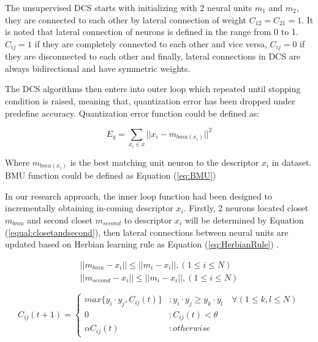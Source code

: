 The unsupervised DCS starts with initializing with 2 neural units $m_1$ and $m_2$, they are connected to each other by lateral connection of weight $C_{12} = C_{21} = 1$. It is noted that lateral connection of neurons is defined in the range from 0 to 1. $C_{ij} = 1$ if they are completely connected to each other and vice versa, $C_{ij} = 0$ if they are disconnected to each other and finally, lateral connections in DCS are always bidirectional and have symmetric weights.

The DCS algorithms then enters into outer loop which repeated until stopping condition is raised, meaning that, quantization error has been dropped under predefine accuracy. Quantization error function could be defined as:

\begin{equation}
	\label{eq:Quantizationerror}
	E_q = \sum_{x_i \in x}||x_i - m_{bmu(x_i)} ||^2
\end{equation}  

Where $m_{bmu(x_i)}$ is the best matching unit neuron to the descriptor $x_i$ in dataset. BMU function could be defined as Equation (\ref{eq:BMU})
 
In our research approach, the inner loop function had been designed to incrementally obtaining in-coming descriptor $x_i$. Firstly, 2 neurons located closet $m_{bmu}$ and second closet $m_{second}$ to descriptor $x_i$ will be determined by Equation (\ref{equal:closetandsecond}), then lateral connections between neural units are updated based on Herbian learning rule \cite{martinetz1993competitive} as Equation (\ref{eq:HerbianRule}) .

\begin{equation}
\begin{split}
\label{equal:closetandsecond}
 ||m_{bmu} - x_i|| \le ||m_i - x_i||, (1 \le i \le N) \\
 ||m_{second} - x_i|| \le ||m_i - x_i||, (1 \le i \le N) 
\end{split}
\end{equation}

\begin{equation}
	\label{eq:HerbianRule}
	C_{ij}(t+1) = 
	\begin{cases}
	max\{ y_i \cdot y_j , C_{ij}(t) \} &: y_i \cdot y_j \ge y_k \cdot y_l \quad \forall (1 \le k,l \le N) \\
	0 	   &: C_{ij}(t) < \theta \\
	\alpha C_{ij}(t) &: otherwise
	\end{cases}
\end{equation}


